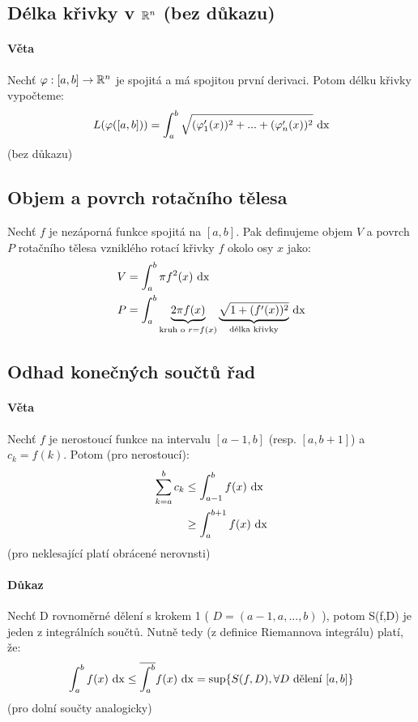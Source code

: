 \documentclass[a4paper,10pt]{article}
\begin{document}
\subsection{Délka křivky v $\mathbb{R}^n$ (bez důkazu)}
\setcounter{equation}{0}
\paragraph{Věta}
Nechť $\varphi: [a,b] \to \mathbb{R}^n$ je spojitá a má spojitou první derivaci. Potom délku
křivky vypočteme:
\begin{align*}
	L(\varphi([a,b])) = \int_a^b \sqrt{ (\varphi_1'(x))^2 + ... +
	(\varphi_n'(x))^2}\operatorname*{\,dx}
\end{align*}
(bez důkazu)

\subsection{Objem a povrch rotačního tělesa}
\setcounter{equation}{0}
Nechť $f$ je nezáporná funkce spojitá na $[a,b]$. Pak definujeme objem $V$ a
povrch $P$
rotačního tělesa vzniklého rotací křivky $f$ okolo osy $x$ jako:
\begin{align*}
	V &= \int_a^b \pi f^2(x) \operatorname*{\,dx} \\
	P &= \int_a^b 
	\underbrace{2\pi f(x)}_{\text{kruh o } r = f(x)} 
	\underbrace{\sqrt{1+(f'(x))^2}} _{\text{délka křivky}}
	\operatorname*{\,dx}
\end{align*}

\subsection{Odhad konečných součtů řad}
\setcounter{equation}{0}
\paragraph{Věta}
Nechť $f$ je nerostoucí funkce na intervalu $[a-1,b]$ (resp. $[a,b+1]$) a $c_k =
f(k)$. Potom (pro nerostoucí):
\begin{align*}
	\sum_{k=a}^b c_k &\le \int_{a-1}^b f(x) \operatorname*{\,dx} \\
		&\ge \int_a^{b+1} f(x) \operatorname*{\,dx}
\end{align*}
(pro neklesající platí obrácené nerovnsti)

\paragraph{Důkaz}
Nechť D rovnoměrné dělení s krokem 1 ( $D=(a-1,a,..., b)$ ), potom S(f,D) je
jeden z integrálních součtů. Nutně tedy (z definice Riemannova integrálu) platí,
že:
\begin{align}
	\int_a^b f(x) \operatorname*{\,dx} \le \overline{\int_a^b} f(x) \operatorname*{\,dx} = \sup \{ S(f,D), \forall D
	\text{ dělení } [a,b] \}
\end{align}
(pro dolní součty analogicky)
\end{document}
